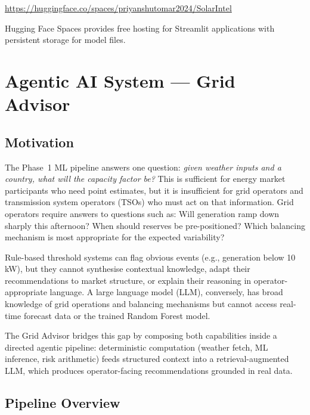 \documentclass[12pt, a4paper]{article}
\begin{document}
\begin{center}
    \url{https://huggingface.co/spaces/priyanshutomar2024/SolarIntel}
\end{center}

Hugging Face Spaces provides free hosting for Streamlit applications with persistent storage for model files.


\newpage
\section{Agentic AI System --- Grid Advisor}
\label{sec:gridadvisor}

\subsection{Motivation}

The Phase~1 ML pipeline answers one question: \textit{given weather inputs and a country, what will the capacity factor be?} This is sufficient for energy market participants who need point estimates, but it is insufficient for grid operators and transmission system operators (TSOs) who must act on that information. Grid operators require answers to questions such as: Will generation ramp down sharply this afternoon? When should reserves be pre-positioned? Which balancing mechanism is most appropriate for the expected variability?

Rule-based threshold systems can flag obvious events (e.g., generation below 10\,kW), but they cannot synthesise contextual knowledge, adapt their recommendations to market structure, or explain their reasoning in operator-appropriate language. A large language model (LLM), conversely, has broad knowledge of grid operations and balancing mechanisms but cannot access real-time forecast data or the trained Random Forest model.

The Grid Advisor bridges this gap by composing both capabilities inside a directed agentic pipeline: deterministic computation (weather fetch, ML inference, risk arithmetic) feeds structured context into a retrieval-augmented LLM, which produces operator-facing recommendations grounded in real data.

\subsection{Pipeline Overview}
\end{document}
